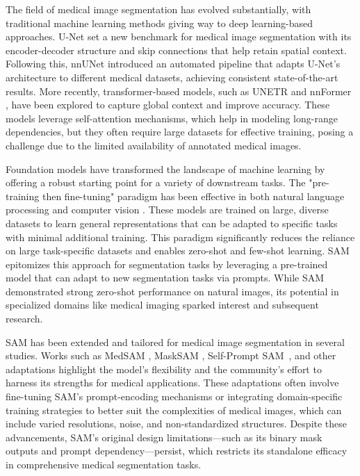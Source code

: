 The field of medical image segmentation has evolved substantially, with traditional machine learning methods giving way to deep learning-based approaches. U-Net \cite{ronneberger2015u} set a new benchmark for medical image segmentation with its encoder-decoder structure and skip connections that help retain spatial context. Following this, nnUNet \cite{isensee2019automated} introduced an automated pipeline that adapts U-Net's architecture to different medical datasets, achieving consistent state-of-the-art results. More recently, transformer-based models, such as UNETR \cite{hatamizadeh2022unetr} and nnFormer \cite{zhou2021nnformer}, have been explored to capture global context and improve accuracy. These models leverage self-attention mechanisms, which help in modeling long-range dependencies, but they often require large datasets for effective training, posing a challenge due to the limited availability of annotated medical images.

Foundation models have transformed the landscape of machine learning by offering a robust starting point for a variety of downstream tasks. The "pre-training then fine-tuning" paradigm has been effective in both natural language processing and computer vision \cite{devlin2018bert, he2022masked}. These models are trained on large, diverse datasets to learn general representations that can be adapted to specific tasks with minimal additional training. This paradigm significantly reduces the reliance on large task-specific datasets and enables zero-shot and few-shot learning. SAM \cite{kirillov2023segment} epitomizes this approach for segmentation tasks by leveraging a pre-trained model that can adapt to new segmentation tasks via prompts. While SAM demonstrated strong zero-shot performance on natural images, its potential in specialized domains like medical imaging sparked interest and subsequent research.

SAM has been extended and tailored for medical image segmentation in several studies. Works such as MedSAM \cite{ma2024segment}, MaskSAM \cite{xie2024masksam}, Self-Prompt SAM~\cite{xie2025selfpromptsammedicalimage}, and other adaptations \cite{zhang2024segment, deng2023sam} highlight the model's flexibility and the community's effort to harness its strengths for medical applications. These adaptations often involve fine-tuning SAM's prompt-encoding mechanisms or integrating domain-specific training strategies to better suit the complexities of medical images, which can include varied resolutions, noise, and non-standardized structures. Despite these advancements, SAM's original design limitations—such as its binary mask outputs and prompt dependency—persist, which restricts its standalone efficacy in comprehensive medical segmentation tasks.

